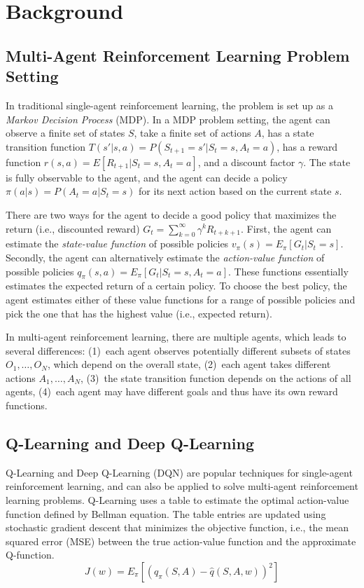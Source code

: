 
\section{Background}
\label{sec:background}

\subsection{Multi-Agent Reinforcement Learning Problem Setting}

In traditional single-agent reinforcement learning, the problem is set up as a
\emph{Markov Decision Process} (MDP). In a MDP problem setting, the agent can observe
a finite set of states $S$, take a finite set of actions $A$, has a state
transition function $T(s'|s,a) = P(S_{t+1}=s'|S_t=s, A_t=a)$, has a reward
function $r(s,a) = E[R_{t+1}|S_t=s, A_t=a]$, and a discount factor $\gamma$.
The state is fully observable to the agent, and the agent can decide a policy
$\pi(a|s) = P(A_t=a | S_t=s)$ for its next action based on the current state
$s$.

There are two ways for the agent to decide a good policy that maximizes the
return (i.e., discounted reward) $G_t = \sum_{k=0}^\infty \gamma^k R_{t+k+1}$.
First, the agent can estimate the \emph{state-value function} of possible policies
$v_\pi(s) = E_\pi[G_t|S_t=s]$. Secondly, the agent can alternatively
estimate the \emph{action-value function} of possible policies
$q_\pi(s,a) = E_\pi[G_t|S_t=s, A_t=a]$. These functions essentially estimates
the expected return of a certain policy. To choose the best policy, the agent
estimates either of these value functions for a range of possible policies and
pick the one that has the highest value (i.e., expected return).

In multi-agent reinforcement learning, there are multiple agents, which leads
to several differences: (1)~each agent observes potentially different subsets
of states $O_1,\ldots,O_N$, which depend on the overall state, (2)~each agent
takes different actions $A_1,\ldots,A_N$, (3)~the state transition function
depends on the actions of all agents, (4)~each agent may have different goals
and thus have its own reward functions.


\subsection{Q-Learning and Deep Q-Learning}

Q-Learning and Deep Q-Learning (DQN) are popular techniques for single-agent
reinforcement learning, and can also be applied to solve multi-agent
reinforcement learning problems. Q-Learning uses a table to estimate the
optimal action-value function defined by Bellman equation. The table entries
are updated using stochastic gradient descent that minimizes the objective
function, i.e., the mean squared error (MSE) between the true action-value
function and the approximate Q-function.
\begin{equation}
J(w) = E_\pi[(q_\pi(S,A) - \hat q(S,A,w))^2]
\end{equation}
	
